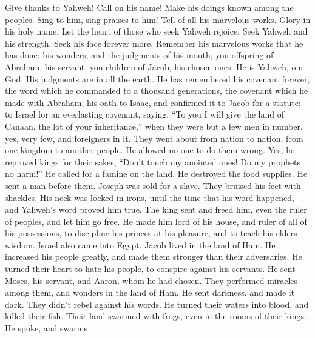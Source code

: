  Give thanks to Yahweh! Call on his name! Make his doings
known among the peoples.  Sing to him, sing praises to
him! Tell of all his marvelous works.  Glory in his holy
name. Let the heart of those who seek Yahweh rejoice. 
Seek Yahweh and his strength. Seek his face forever more. 
Remember his marvelous works that he has done: his wonders, and the
judgments of his mouth,  you offspring of Abraham, his
servant, you children of Jacob, his chosen ones.  He is
Yahweh, our God. His judgments are in all the earth.  He
has remembered his covenant forever, the word which he commanded to a
thousand generations,  the covenant which he made with
Abraham, his oath to Isaac,  and confirmed it to Jacob
for a statute; to Israel for an everlasting covenant, 
saying, ``To you I will give the land of Canaan, the lot of your
inheritance,''  when they were but a few men in number,
yes, very few, and foreigners in it.  They went about
from nation to nation, from one kingdom to another people.
 He allowed no one to do them wrong. Yes, he reproved
kings for their sakes,  ``Don't touch my anointed ones!
Do my prophets no harm!''  He called for a famine on the
land. He destroyed the food supplies.  He sent a man
before them. Joseph was sold for a slave.  They bruised
his feet with shackles. His neck was locked in irons, 
until the time that his word happened, and Yahweh's word proved him
true.  The king sent and freed him, even the ruler of
peoples, and let him go free.  He made him lord of his
house, and ruler of all of his possessions,  to
discipline his princes at his pleasure, and to teach his elders wisdom.
 Israel also came into Egypt. Jacob lived in the land of
Ham.  He increased his people greatly, and made them
stronger than their adversaries.  He turned their heart
to hate his people, to conspire against his servants.  He
sent Moses, his servant, and Aaron, whom he had chosen. 
They performed miracles among them, and wonders in the land of Ham.
 He sent darkness, and made it dark. They didn't rebel
against his words.  He turned their waters into blood,
and killed their fish.  Their land swarmed with frogs,
even in the rooms of their kings.  He spoke, and swarms
